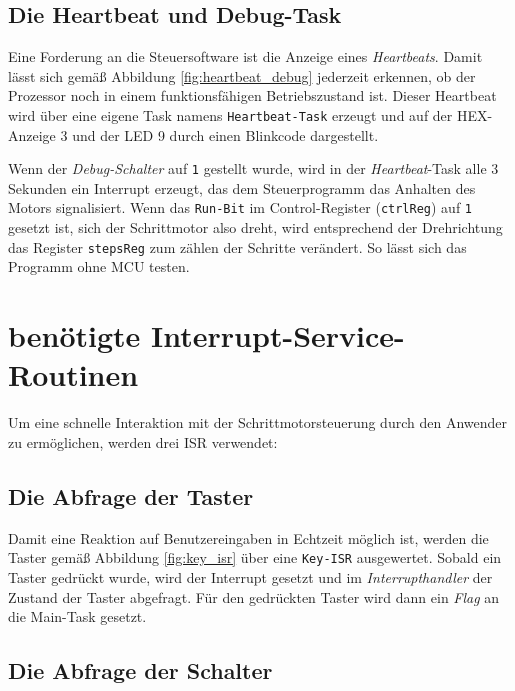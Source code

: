 \documentclass[ngerman,fontsize=12pt , paper=a4 , twoside=false , DIV12 , BCOR=1cm ,
numbers=enddot , listof=totoc , bibliography=totoc , index=totoc ,
headings=small , headlines=1.5 , final]{scrbook}
\begin{document}
\subsection{Die Heartbeat und
Debug-Task}\label{die-heartbeat-und-debug-task}

Eine Forderung an die Steuersoftware ist die Anzeige eines
\emph{Heartbeats}. Damit lässt sich gemäß Abbildung
\ref{fig:heartbeat_debug} jederzeit erkennen, ob der Prozessor noch in
einem funktionsfähigen Betriebszustand ist. Dieser Heartbeat wird über
eine eigene Task namens \lstinline!Heartbeat-Task! erzeugt und auf der
HEX-Anzeige 3 und der LED 9 durch einen Blinkcode dargestellt.

Wenn der \emph{Debug-Schalter} auf \lstinline!1! gestellt wurde, wird in
der \emph{Heartbeat}-Task alle 3 Sekunden ein Interrupt erzeugt, das dem
Steuerprogramm das Anhalten des Motors signalisiert. Wenn das
\lstinline!Run-Bit! im Control-Register (\lstinline!ctrlReg!) auf
\lstinline!1! gesetzt ist, sich der Schrittmotor also dreht, wird
entsprechend der Drehrichtung das Register \lstinline!stepsReg! zum
zählen der Schritte verändert. So lässt sich das Programm ohne MCU
testen.

\section{benötigte
Interrupt-Service-Routinen}\label{benuxf6tigte-interrupt-service-routinen}

Um eine schnelle Interaktion mit der Schrittmotorsteuerung durch den
Anwender zu ermöglichen, werden drei ISR verwendet:

\subsection{Die Abfrage der Taster}\label{die-abfrage-der-taster}

Damit eine Reaktion auf Benutzereingaben in Echtzeit möglich ist, werden
die Taster gemäß Abbildung \ref{fig:key_isr} über eine
\lstinline!Key-ISR! ausgewertet. Sobald ein Taster gedrückt wurde, wird
der Interrupt gesetzt und im \emph{Interrupthandler} der Zustand der
Taster abgefragt. Für den gedrückten Taster wird dann ein \emph{Flag} an
die Main-Task gesetzt.

\subsection{Die Abfrage der Schalter}\label{die-abfrage-der-schalter}
\end{document}

